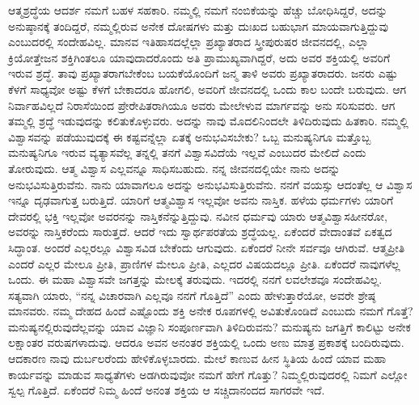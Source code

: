 ಆತ್ಮಶ್ರದ್ಧೆಯ ಆದರ್ಶ ನಮಗೆ ಬಹಳ ಸಹಕಾರಿ. ನಮ್ಮಲ್ಲಿ ನಮಗೆ ನಂಬಿಕೆಯನ್ನು ಹೆಚ್ಚು ಬೋಧಿಸಿದ್ದರೆ, ಅದನ್ನು ಅನುಷ್ಠಾನಕ್ಕೆ ತಂದಿದ್ದರೆ, ನಮ್ಮಲ್ಲಿರುವ ಅನೇಕ ದೋಷಗಳು ಮತ್ತು ದುಃಖದ ಬಹುಭಾಗ ಮಾಯವಾಗುತ್ತಿದ್ದುವು ಎಂಬುದರಲ್ಲಿ ಸಂದೇಹವಿಲ್ಲ. ಮಾನವ ಇತಿಹಾಸದಲ್ಲೆಲ್ಲಾ ಪ್ರಖ್ಯಾತರಾದ ಸ್ತ್ರೀಪುರುಷರ ಜೀವನದಲ್ಲಿ, ಎಲ್ಲಾ ಕ್ರಿಯೋತ್ತೇಜನ ಶಕ್ತಿಗಿಂತಲೂ ಯಾವುದಾದರೊಂದು ಅತಿ ಪ್ರಾಮುಖ್ಯವಾಗಿದ್ದರೆ, ಅದು ಅವರ ಶಕ್ತಿಯಲ್ಲಿ ಅವರಿಗೆ ಇರುವ ಶ್ರದ್ಧೆ. ತಾವು ಪ್ರಖ್ಯಾತರಾಗಬೇಕೆಂಬ ಬಯಕೆಯೊಂದಿಗೆ ಜನ್ಮ ತಾಳಿ ಅವರು ಪ್ರಖ್ಯಾತರಾದರು. ಜನರು ಎಷ್ಟು ಕೆಳಗೆ ಸಾಧ್ಯವೋ ಅಷ್ಟು ಕೆಳಗೆ ಬೇಕಾದರೂ ಹೋಗಲಿ, ಅವರಿಗೆ ಜೀವನದಲ್ಲಿ ಒಂದು ಕಾಲ ಬಂದೇ ಬರುವುದು. ಆಗ ನಿರ್ವಾಹವಿಲ್ಲದೆ ನಿರಾಸೆಯಿಂದ ಪ್ರೇರೇಪಿತರಾಗಿಯೂ ಅವರು ಮೇಲೇಳುವ ಮಾರ್ಗವನ್ನು ಅನು ಸರಿಸುವರು. ಆಗ ತಮ್ಮಲ್ಲಿ ಶ್ರದ್ಧೆ ಇಡುವುದನ್ನು ಕಲಿತುಕೊಳ್ಳುವರು. ಅದನ್ನು ನಾವು ಮೊದಲಿನಿಂದಲೇ ತಿಳಿದಿರುವುದು ಹಿತಕಾರಿ. ನಮ್ಮಲ್ಲಿ ವಿಶ್ವಾಸವನ್ನು ಪಡೆಯುವುದಕ್ಕೆ ಈ ಕಷ್ಟವನ್ನೆಲ್ಲಾ ಏತಕ್ಕೆ ಅನುಭವಿಸಬೇಕು? ಒಬ್ಬ ಮನುಷ್ಯನಿಗೂ ಮತ್ತೊಬ್ಬ ಮನುಷ್ಯನಿಗೂ ಇರುವ ವ್ಯತ್ಯಾಸವೆಲ್ಲ ತನ್ನಲ್ಲಿ ತನಗೆ ವಿಶ್ವಾಸವಿದೆಯೆ ಇಲ್ಲವೆ ಎಂಬುದರ ಮೇಲಿದೆ ಎಂದು ತೋರುವುದು. ಆತ್ಮ ವಿಶ್ವಾಸ ಎಲ್ಲವನ್ನೂ ಸಾಧಿಸಬಹುದು. ನನ್ನ ಜೀವನದಲ್ಲಿಯೇ ನಾನು ಅದನ್ನು ಅನುಭವಿಸುತ್ತಿರುವೆನು. ನಾನು ಯಾವಾಗಲೂ ಅದನ್ನು ಅನುಭವಿಸುತ್ತಿರುವೆನು. ನನಗೆ ವಯಸ್ಸು ಆದಂತೆಲ್ಲ ಆ ವಿಶ್ವಾಸ ಇನ್ನೂ ದೃಢವಾಗುತ್ತ ಬರುತ್ತಿದೆ. ಯಾರಿಗೆ ಆತ್ಮವಿಶ್ವಾಸ ಇಲ್ಲವೋ ಅವನು ನಾಸ್ತಿಕ. ಹಳೆಯ ಧರ್ಮಗಳು ಯಾರಿಗೆ ದೇವರಲ್ಲಿ ಭಕ್ತಿ ಇಲ್ಲವೋ ಅವರನನ್ನು ನಾಸ್ತಿಕನೆನ್ನುತ್ತಿದ್ದುವು. ನವೀನ ಧರ್ಮವು ಯಾರು ಆತ್ಮವಿಶ್ವಾಸಹೀನರೋ, ಅವರನ್ನು ನಾಸ್ತಿಕರೆಂದು ಸಾರುತ್ತದೆ. ಆದರೆ ಇದು ಸ್ವಾರ್ಥಪರತೆಯ ಶ್ರದ್ಧೆಯಲ್ಲ. ಏಕೆಂದರೆ ವೇದಾಂತವೆ ಏಕತ್ವದ ಸಿದ್ಧಾಂತ. ಅಂದರೆ ಎಲ್ಲರಲ್ಲೂ ವಿಶ್ವಾಸವಿಡ ಬೇಕೆಂದು ಆಗುವುದು. ಏಕೆಂದರೆ ನೀನೇ ಸರ್ವವೂ ಆಗಿರುವೆ. ಆತ್ಮಪ್ರೀತಿ ಎಂದರೆ ಎಲ್ಲರ ಮೇಲೂ ಪ್ರೀತಿ, ಪ್ರಾಣಿಗಳ ಮೇಲೂ ಪ್ರೀತಿ, ಎಲ್ಲದರ ವಿಷಯದಲ್ಲೂ ಪ್ರೀತಿ. ಏಕೆಂದರೆ ನಾವುಗಳೆಲ್ಲ ಒಂದು. ಈ ಮಹಾ ವಿಶ್ವಾಸವೇ ಜಗತ್ತನ್ನು ಮೇಲಕ್ಕೆ ತರುವುದು. ಇದರಲ್ಲಿ ನನಗೆ ಲವಲೇಶವೂ ಸಂದೇಹವಿಲ್ಲ. ಸತ್ಯವಾಗಿ ಯಾರು, “ನನ್ನ ವಿಚಾರವಾಗಿ ಎಲ್ಲವೂ ನನಗೆ ಗೊತ್ತಿದೆ” ಎಂದು ಹೇಳುತ್ತಾರೆಯೋ, ಅವರೇ ಶ್ರೇಷ್ಠ ಮಾನವರು. ನಮ್ಮ ದೇಹದ ಹಿಂದೆ ಎಷ್ಟೊಂದು ಶಕ್ತಿ ಅನೇಕ ರೂಪಗಳಲ್ಲಿ ಅವಿತುಕೊಂಡಿದೆ ಎಂಬುದು ನಮಗೆ ಗೊತ್ತೆ? ಮನುಷ್ಯನಲ್ಲಿರುವುದೆಲ್ಲವನ್ನು ಯಾವ ವಿಜ್ಞಾನಿ ಸಂಪೂರ್ಣವಾಗಿ ತಿಳಿದಿರುವನು? ಮನುಷ್ಯನು ಜಗತ್ತಿಗೆ ಕಾಲಿಟ್ಟು ಅನೇಕ ಲಕ್ಷಾಂತರ ವರುಷಗಳಾದುವು. ಆದರೂ ಅವನ ಅನಂತರ ಶಕ್ತಿಯಲ್ಲಿ ಒಂದು ಅಣು ಮಾತ್ರ ಪ್ರಕಾಶಕ್ಕೆ ಬಂದಿರುವುದು. ಆದಕಾರಣ ನಾವು ದುರ್ಬಲರೆಂದು ಹೇಳಿಕೊಳ್ಳಬಾರದು. ಮೇಲೆ ಕಾಣುವ ಹೀನ ಸ್ಥಿತಿಯ ಹಿಂದೆ ಯಾವ ಮಹಾ ಕಾರ್ಯವನ್ನು ಮಾಡುವ ಸಾಧ್ಯತೆಗಳು ಅಡಗಿರುವುವೋ ನಮಗೆ ಹೇಗೆ ಗೊತ್ತು? ನಿಮ್ಮಲ್ಲಿರುವುದರಲ್ಲಿ ನಿಮಗೆ ಎಲ್ಲೋ ಸ್ವಲ್ಪ ಗೊತ್ತಿದೆ. ಏಕೆಂದರೆ ನಿಮ್ಮ ಹಿಂದೆ ಅನಂತ ಶಕ್ತಿಯ ಆ ಸಚ್ಚಿದಾನಂದದ ಸಾಗರವೇ ಇದೆ. 

\vskip 8pt

